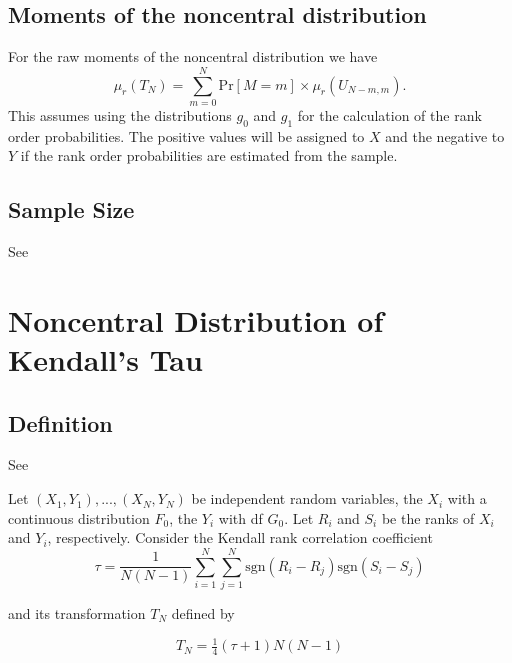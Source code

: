 \subsection{Moments of the noncentral distribution}
For the raw moments of the noncentral distribution we have
\begin{equation} 
	\mu_r(T_N) = \sum_{m=0}^N \text{Pr}[M=m] \times \mu_r(U_{N-m,m}).
\end{equation}
This assumes using the distributions $g_0$ and $g_1$ for the calculation of the rank order probabilities. The positive values will be assigned to $X$ and the negative to $Y$ if the rank order probabilities are estimated from the sample.




\subsection{Sample Size}

See \cite{noether_sample_1987}

%




\newpage
\section{Noncentral Distribution of Kendall's Tau}


\subsection{Definition}
\label{KendallTauDistributionDefinition}

See \cite{Wang_2003_Rank}

Let $(X_1, Y_1),...,(X_N, Y_N)$ be independent random variables, the $X_i$ with a continuous distribution $F_0$, the $Y_i$ with df $G_0$. Let $R_i$ and $S_i$ be the ranks of $X_i$ and $Y_i$, respectively.
Consider the Kendall rank correlation coefficient
\begin{equation} 
	\tau = \frac{1}{N(N-1)} \sum_{i=1}^N \sum_{j=1}^N \text{sgn}(R_i - R_j)  \text{sgn}(S_i - S_j)
\end{equation}

and its transformation $T_N$ defined by

\begin{equation} 
	T_N = \tfrac{1}{4} (\tau+1)N(N-1)
\end{equation}


